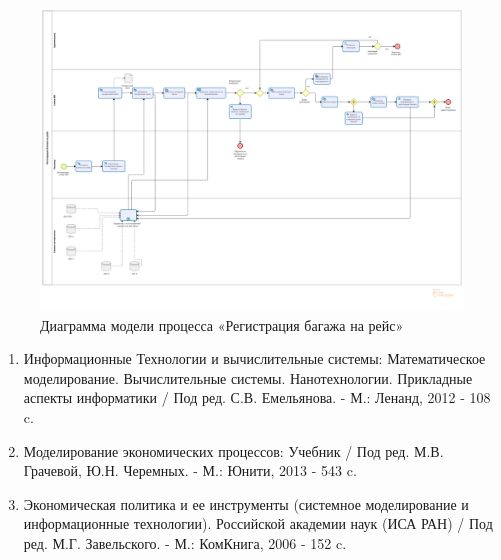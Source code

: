 \documentclass[a4paper,14pt]{extarticle}
\begin{document}
\captionsetup*[figure]{labelformat=gostfigureappendix, justification=centering}  %
\begin{figure}[h!]
	\centering
	\includegraphics[angle=90,height=\linewidth]{images/pr-15/15}
	\caption{Диаграмма модели процесса «Регистрация багажа на рейс»}
	\label{fig:15}
\end{figure}

\newpage
{}
\begin{enumerate}
	\item Информационные Технологии и вычислительные системы: Математическое
	моделирование. Вычислительные системы. Нанотехнологии. Прикладные
	аспекты информатики / Под ред. С.В. Емельянова. - М.: Ленанд, 2012 - 108 c.
	\item  Моделирование экономических процессов: Учебник / Под ред. М.В.
	Грачевой, Ю.Н. Черемных. - М.: Юнити, 2013 - 543 c.
	\item  Экономическая политика и ее инструменты (системное моделирование и
	информационные
	технологии).
	Российской академии наук (ИСА РАН) / Под ред. М.Г. Завельского. - М.:
	КомКнига, 2006 - 152 c.
\end{enumerate}
\end{document}
